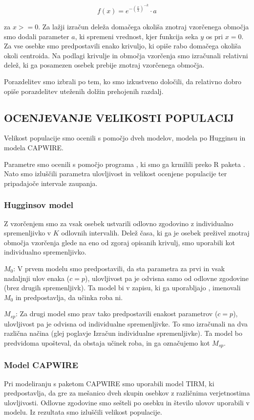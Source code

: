 \[
f(x) = e^{-(\frac{x}{\lambda})^{-k}}  \cdot a
\]

za $x >= 0$. Za lažji izračun deleža domačega okoliša znotraj vzorčenega območja smo dodali parameter $a$, ki spremeni vrednost, kjer funkcija seka $y$ os pri $x = 0$.
Za vse osebke smo predpostavili enako krivuljo, ki opiše rabo domačega okoliša okoli centroida. Na podlagi krivulje in območja vzorčenja smo izračunali relativni delež, ki ga posamezen osebek prebije znotraj vzorčenega območja.

Porazdelitev smo izbrali po tem, ko smo izkustveno določili, da relativno dobro opiše porazdelitev uteženih dolžin prehojenih razdalj.


\subsection{OCENJEVANJE VELIKOSTI POPULACIJ}
Velikost populacije smo ocenili s pomočjo dveh modelov, modela po Hugginsu in modela CAPWIRE.

Parametre smo ocenili s pomočjo programa  \citep{cooch_program_2012}, ki smo ga krmilili preko R paketa  \citep{laake_2013}. Nato smo izluščili parametra ulovljivost in velikost ocenjene populacije ter pripadajoče intervale zaupanja.

\subsubsection[\bfseries Hugginsov model]{Hugginsov model}
Z vzorčenjem smo za vsak osebek ustvarili odlovno zgodovino z individualno spremenljivko v $K$ odlovnih intervalih. Delež časa, ki ga je osebek preživel znotraj območja vzorčenja glede na eno od zgoraj opisanih krivulj, smo uporabili kot individualno spremenljivko.

$M_0$: V prvem modelu smo predpostavili, da sta parametra za prvi in vsak nadaljnji ulov enaka ($c = p$), ulovljivost pa je odvisna samo od odlovne zgodovine (brez drugih spremenljivk). Ta model bi v zapisu, ki ga uporabljajo \citep{otis_statistical_1978}, imenovali $M_0$ in predpostavlja, da učinka roba ni.

$M_{sp}$: Za drugi model smo prav tako predpostavili enakost parametrov ($c=p$), ulovljivost pa je odvisna od individualne spremenljivke. To smo izračunali na dva različna načina (glej poglavje Izračun individualne spremenljivke). Ta model bo predvidoma upošteval, da obstaja učinek roba, in ga označujemo kot $M_{sp}$.

\subsubsection[\bfseries Model CAPWIRE]{Model CAPWIRE}
Pri modeliranju s paketom CAPWIRE \citep{pennell_miller_2012} smo uporabili model TIRM, ki predpostavlja, da gre za mešanico dveh skupin osebkov z različnima verjetnostima ulovljivosti. Odlovne zgodovine smo sešteli po osebku in število ulovov uporabili v modelu. Iz rezultata smo izluščili velikost populacije.

